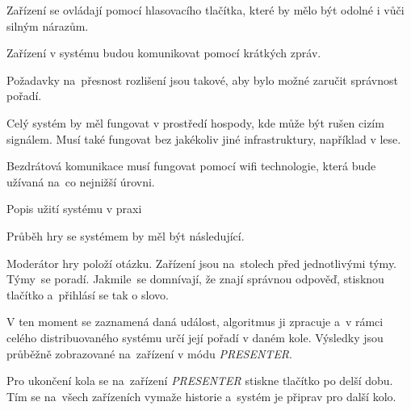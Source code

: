 Zařízení se ovládají pomocí hlasovacího tlačítka, které by mělo být odolné i vůči silným nárazům.

Zařízení v systému budou komunikovat pomocí krátkých zpráv.

Požadavky na~přesnost rozlišení jsou takové, aby bylo možné zaručit správnost pořadí.

Celý systém by měl fungovat v prostředí hospody, kde může být rušen cizím signálem. Musí také fungovat bez jakékoliv jiné infrastruktury, například v lese.

Bezdrátová komunikace musí fungovat pomocí wifi technologie, která bude užívaná na~co nejnižší úrovni.

\sec Popis užití systému v praxi

Průběh hry se systémem by měl být následující.

Moderátor hry položí otázku. Zařízení jsou na~stolech před jednotlivými týmy. Týmy~se poradí. Jakmile~se domnívají, že znají správnou odpověď, stisknou tlačítko a~přihlásí se tak o slovo.

V ten moment se zaznamená daná událost, algoritmus ji zpracuje a~v rámci celého distribuovaného systému určí její pořadí v daném kole. Výsledky jsou průběžně zobrazované na~zařízení v módu {\em PRESENTER}.

Pro ukončení kola se na~zařízení {\em PRESENTER} stiskne tlačítko po delší dobu. Tím se na~všech zařízeních vymaže historie a~systém je připrav pro další kolo.
